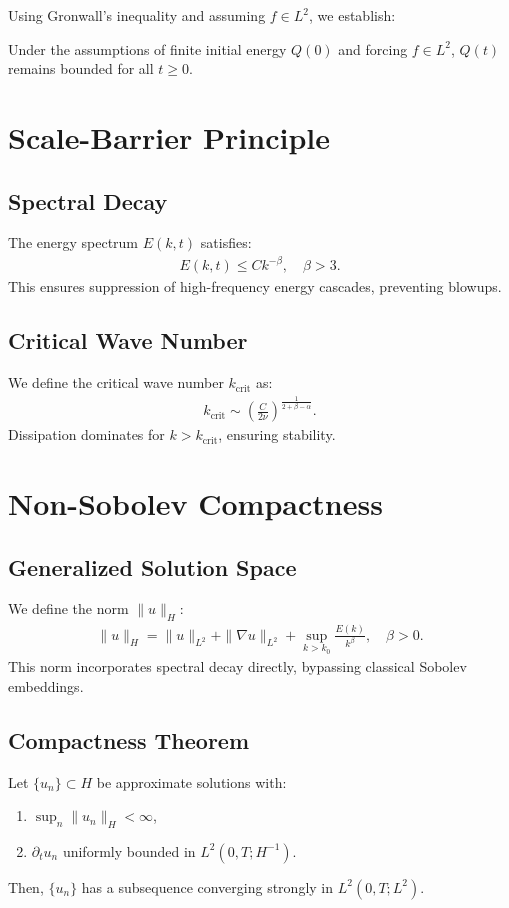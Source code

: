 \documentclass[12pt]{article}
\begin{document}
Using Gronwall's inequality and assuming $f \in L^2$, we establish:
\begin{theorem}[Boundedness of $Q(t)$]
Under the assumptions of finite initial energy $Q(0)$ and forcing $f \in L^2$, $Q(t)$ remains bounded for all $t \geq 0$.
\end{theorem}

\section{Scale-Barrier Principle}
\subsection{Spectral Decay}
The energy spectrum $E(k,t)$ satisfies:
\begin{align}
E(k,t) \leq C k^{-\beta}, \quad \beta > 3. \label{spectral_decay}
\end{align}
This ensures suppression of high-frequency energy cascades, preventing blowups.

\subsection{Critical Wave Number}
We define the critical wave number $k_{\text{crit}}$ as:
\begin{align}
k_{\text{crit}} \sim \left(\frac{C}{2\nu}\right)^{\frac{1}{2+\beta-\alpha}}.
\end{align}
Dissipation dominates for $k > k_{\text{crit}}$, ensuring stability.

\section{Non-Sobolev Compactness}
\subsection{Generalized Solution Space}
We define the norm $\|u\|_H$:
\begin{align}
\|u\|_H = \|u\|_{L^2} + \|\nabla u\|_{L^2} + \sup_{k>k_0} \frac{E(k)}{k^\beta}, \quad \beta > 0.
\end{align}
This norm incorporates spectral decay directly, bypassing classical Sobolev embeddings.

\subsection{Compactness Theorem}
\begin{theorem}[Compactness in $H$]
Let $\{u_n\} \subset H$ be approximate solutions with:
\begin{enumerate}
    \item $\sup_n \|u_n\|_H < \infty$,
    \item $\partial_t u_n$ uniformly bounded in $L^2(0,T;H^{-1})$.
\end{enumerate}
Then, $\{u_n\}$ has a subsequence converging strongly in $L^2(0,T;L^2)$.
\end{theorem}
\end{document}
